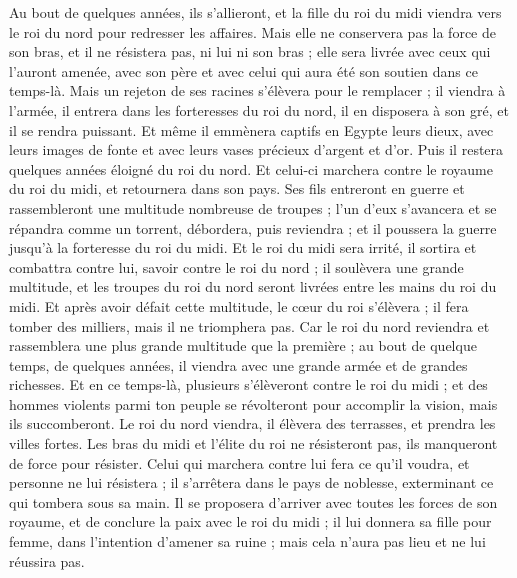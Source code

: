 \begin{multicols}{2}
Au bout de quelques années, ils s'allieront, et la fille du roi du midi viendra vers le roi du nord pour redresser les affaires. Mais elle ne conservera pas la force de son bras, et il ne résistera pas, ni lui ni son bras ; elle sera livrée avec ceux qui l’auront amenée, avec son père et avec celui qui aura été son soutien dans ce temps-là.
Mais un rejeton de ses racines s’élèvera pour le remplacer ; il viendra à l’armée, il entrera dans les forteresses du roi du nord, il en disposera à son gré, et il se rendra puissant.
Et même il emmènera captifs en Egypte leurs dieux, avec leurs images de fonte et avec leurs vases précieux d'argent et d'or.  Puis il restera quelques années éloigné du roi du nord.
Et celui-ci marchera contre le royaume du roi du  midi, et retournera dans son pays.
Ses fils  entreront en guerre et rassembleront une multitude nombreuse de troupes ; l'un d'eux s’avancera et se répandra comme un torrent,  débordera, puis reviendra ; et il poussera la guerre jusqu'à la forteresse du roi du midi.
Et le roi du midi sera irrité, il sortira et combattra contre lui, savoir contre le roi du nord ; il soulèvera une grande multitude, et les troupes du roi du nord seront livrées entre les mains du roi du midi.
Et après avoir défait cette multitude, le cœur du roi s’élèvera ; il fera tomber des milliers, mais il ne triomphera pas.
Car le roi du nord reviendra et rassemblera une plus grande multitude que la première ; au bout de quelque temps, de quelques années, il viendra avec une grande armée et de grandes richesses.
Et en ce temps-là, plusieurs s'élèveront contre le roi du midi ; et des hommes violents parmi ton peuple se révolteront pour accomplir la vision, mais ils succomberont.
Le roi du nord viendra, il élèvera des terrasses, et prendra les villes fortes.  Les bras du midi et l’élite du roi ne résisteront pas, ils manqueront de force pour résister.
Celui qui marchera contre lui fera ce qu’il voudra, et personne ne lui résistera ; il s’arrêtera dans le pays de noblesse, exterminant ce qui tombera sous sa main.
Il se proposera d’arriver avec toutes les forces de son royaume, et de conclure la paix avec le roi du midi ; il lui donnera sa fille pour femme, dans l’intention d’amener sa ruine ; mais cela n’aura pas lieu et ne lui réussira pas.

\end{multicols}
